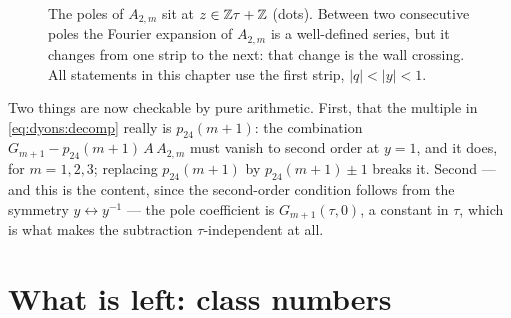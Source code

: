 \begin{figure}[htbp]
\centering
{}
\caption{The poles of $A_{2,m}$ sit at $z\in\mathbb{Z}\tau+\mathbb{Z}$ (dots). Between two consecutive poles the
Fourier expansion of $A_{2,m}$ is a well-defined series, but it changes from one strip to the
next: that change is the wall crossing. All statements in this chapter use the first strip,
$|q|<|y|<1$.}\label{fig:dyons:strips}
\end{figure}

Two things are now checkable by pure arithmetic. First, that the multiple in
\eqref{eq:dyons:decomp} really is $p_{24}(m+1)$: the combination
$G_{m+1}-p_{24}(m+1)\,A\,A_{2,m}$ must vanish to second order at $y=1$, and it does, for
$m=1,2,3$; replacing $p_{24}(m+1)$ by $p_{24}(m+1)\pm1$ breaks it. Second --- and this is the
content, since the second-order condition follows from the symmetry $y\leftrightarrow y^{-1}$
--- the pole coefficient is $G_{m+1}(\tau,0)$, a constant in $\tau$, which is what makes the
subtraction $\tau$-independent at all.

\section{What is left: class numbers}\label{sec:dyons:classnumbers}


